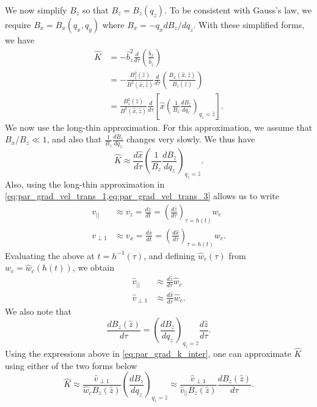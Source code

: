 \documentclass[oneside,a4paper,11pt]{report}
\begin{document}
We now simplify $B_z$ so that $B_z = B_z(q_z)$. To be consistent with Gauss's law, we require $B_x = B_x(q_x,q_y)$ where $B_x = -q_x dB_z/dq_z$. With these simplified forms, we have
\begin{align}
    \hat{K} &= -\hat{b}_z^2 \frac{d}{d\tau} \left ( \frac{\hat{b}_x}{\hat{b}_z} \right ) \\
    &= -\frac{B_z^2(\hat{z})}{B^2(\hat{x},\hat{z})} \frac{d}{d\tau} \left ( \frac{B_x(\hat{x},\hat{z})}{B_z(\hat{z})} \right ) \\
    &= \frac{B_z^2(\hat{z})}{B^2(\hat{x},\hat{z})} \frac{d}{d\tau} \left [ \hat{x}  \left ( \frac{1}{B_z} \frac{dB_z}{dq_z} \right )_{q_z = \hat{z}} \right ].
\end{align}
We now use the long-thin approximation. For this approximation, we assume that $B_x / B_z \ll 1$, and also that $\frac{1}{B_z} \frac{dB_z}{dq_z}$ changes very slowly. We thus have
\begin{equation}
\label{eq:par_grad_k_inter}
    \hat{K} \approx \frac{d \hat{x}}{d\tau} \left ( \frac{1}{B_z} \frac{dB_z}{dq_z} \right)_{q_z = \hat{z}}.
\end{equation}
Also, using the long-thin approximation in \cref{eq:par_grad_vel_trans_1,eq:par_grad_vel_trans_3} allows us to write
\begin{align}
    v_{||} &\approx v_z = \frac{dz}{dt} = \left ( \frac{d\hat{z}}{d\tau} \right)_{\tau = h(t)} w_c \\
    v_{\perp1} & \approx v_x = \frac{dx}{dt} = \left ( \frac{d \hat{x}}{d\tau} \right)_{\tau = h(t)} w_c.
\end{align}
Evaluating the above at $t = h^{-1}(\tau)$, and defining $\hat{w}_c(\tau)$ from $w_c = \hat{w}_c(h(t))$, we obtain
\begin{align}
    \hat{v}_{||} &\approx  \frac{d\hat{z}}{d\tau}  \hat{w}_c \\
    \hat{v}_{\perp1} & \approx \frac{d \hat{x}}{d\tau} \hat{w}_c.
\end{align}
We also note that
\begin{equation}
    \frac{d B_z(\hat{z})}{d\tau} = \left ( \frac{dB_z}{dq_z} \right)_{q_z = \hat{z}} \frac{d \hat{z}}{d\tau}.
\end{equation}
Using the expressions above in \cref{eq:par_grad_k_inter}, one can approximate $\hat{K}$ using either of the two forms below
\begin{equation}
    \hat{K} \approx \frac{\hat{v}_{\perp1}}{\hat{w}_c B_z(\hat{z})} \left ( \frac{dB_z}{dq_z} \right)_{q_z = \hat{z}} \approx \frac{\hat{v}_{\perp1}}{\hat{v}_{||} B_z(\hat{z})} \frac{dB_z(\hat{z})}{d\tau} .
\end{equation}
\end{document}
